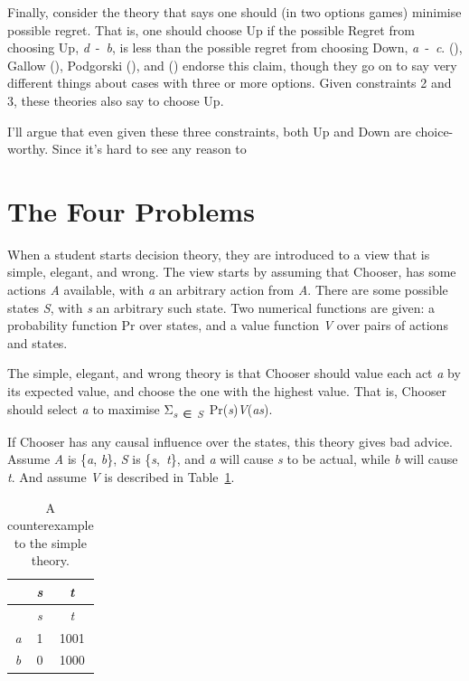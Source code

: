 \documentclass[
  10pt,
  letterpaper,
  DIV=11,
  numbers=noendperiod,
  twoside]{scrartcl}
\begin{document}
Finally, consider the theory that says one should (in two options games)
minimise possible regret. That is, one should choose Up if the possible
Regret from choosing Up, \emph{d}~-~\emph{b}, is less than the possible
regret from choosing Down, \emph{a}~-~\emph{c}.
(), Gallow
(), Podgorski
(), and
() endorse this claim,
though they go on to say very different things about cases with three or
more options. Given constraints 2 and 3, these theories also say to
choose Up.

I'll argue that even given these three constraints, both Up and Down are
choice-worthy. Since it's hard to see any reason to

\section{The Four Problems}\label{the-four-problems}

When a student starts decision theory, they are introduced to a view
that is simple, elegant, and wrong. The view starts by assuming that
Chooser, has some actions \emph{A} available, with \emph{a} an arbitrary
action from \emph{A}. There are some possible states \emph{S}, with
\emph{s} an arbitrary such state. Two numerical functions are given: a
probability function Pr over states, and a value function \emph{V} over
pairs of actions and states.

The simple, elegant, and wrong theory is that Chooser should value each
act \emph{a} by its expected value, and choose the one with the highest
value. That is, Chooser should select \emph{a} to maximise
Σ\textsubscript{\emph{s}~∈~\emph{S}}~Pr(\emph{s})\emph{V}(\emph{as}).

If Chooser has any causal influence over the states, this theory gives
bad advice. Assume \emph{A} is \{\emph{a}, \emph{b}\}, \emph{S} is
\{\emph{s},~\emph{t}\}, and \emph{a} will cause \emph{s} to be actual,
while \emph{b} will cause \emph{t}. And assume \emph{V} is described in
Table~\ref{tbl-joycewindow}.

\begin{longtable}[]{@{}ccc@{}}
\caption{A counterexample to the simple
theory.}\label{tbl-joycewindow}\tabularnewline
\toprule\noalign{}
& \emph{s} & \emph{t} \\
\midrule\noalign{}
\endfirsthead
\toprule\noalign{}
& \emph{s} & \emph{t} \\
\midrule\noalign{}
\endhead
\bottomrule\noalign{}
\endlastfoot
\emph{a} & 1 & 1001 \\
\emph{b} & 0 & 1000 \\
\end{longtable}
\end{document}
